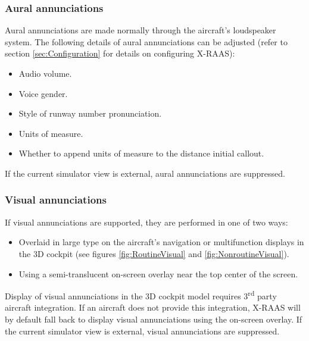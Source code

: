 \documentclass[a4paper,12pt]{article}
\begin{document}
\subsubsection{Aural annunciations}
\label{subsec:AuralAnnunciations}

Aural annunciations are made normally through the aircraft's loudspeaker
system. The following details of aural annunciations can be adjusted
(refer to section \ref{sec:Configuration} for details on configuring X-RAAS):

\begin{itemize}

\item Audio volume.

\item Voice gender.

\item Style of runway number pronunciation.

\item Units of measure.

\item Whether to append units of measure to the distance initial callout.

\end{itemize}

\noindent If the current simulator view is external, aural annunciations
are suppressed.

\subsubsection{Visual annunciations}
\label{subsec:VisualAnnunciations}

If visual annunciations are supported, they are performed in one of two
ways:

\begin{itemize}

\item Overlaid in large type on the aircraft's navigation or
multifunction displays in the 3D cockpit (see figures
\ref{fig:RoutineVisual} and \ref{fig:NonroutineVisual}).

\item Using a semi-translucent on-screen overlay near the top center of
the screen.

\end{itemize}

\noindent Display of visual annunciations in the 3D cockpit model
requires 3\textsuperscript{rd} party aircraft integration. If an
aircraft does not provide this integration, X-RAAS will by default fall
back to display visual annunciations using the on-screen overlay. If the
current simulator view is external, visual annunciations are suppressed.
\end{document}
